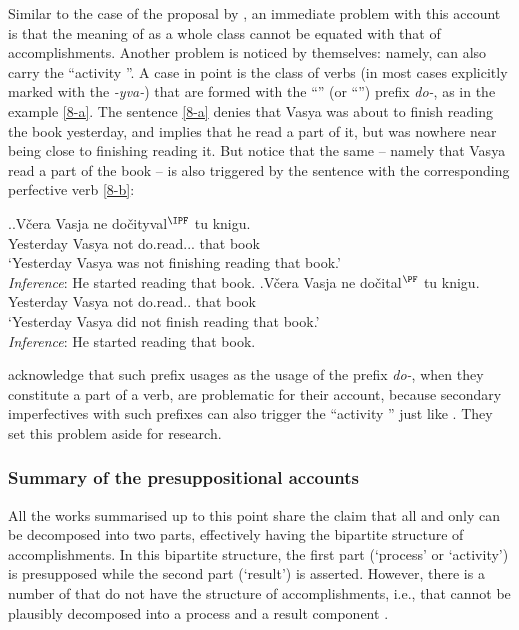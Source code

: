 Similar to the case of the proposal by \citet{Romanova:06}, an immediate problem with this account is that the meaning of  as a whole class cannot be equated with that of accomplishments. Another problem is noticed by \citet{Docekal:09} themselves: namely,  can also carry the ``activity ''. A case in point is the class of  verbs (in most cases explicitly marked with the  \textit{-yva-}) that are formed with the ``'' (or ``'') prefix \textit{do-}, as in the example \ref{8-a}. The sentence \ref{8-a} denies that Vasya was about to finish reading the book yesterday, and implies that he read a part of it, but was nowhere near being close to finishing reading it. But notice that the same  -- namely that Vasya read a part of the book -- is also triggered by the sentence with the corresponding perfective verb \ref{8-b}:

\ex.\label{8}\ag.\label{8-a}V\v{c}era Vasja ne do\v{c}ityval$^{\IPF}$ tu knigu.\\
Yesterday Vasya not do.read... that book\\
\trans `Yesterday Vasya was not finishing reading that book.'\\
\textit{Inference}: He started reading that book.
\bg.\label{8-b}V\v{c}era Vasja ne do\v{c}ital$^{\PF}$ tu knigu.\\
Yesterday Vasya not do.read.. that book\\
\trans `Yesterday Vasya did not finish reading that book.'\\
\textit{Inference}: He started reading that book.

\citet{Docekal:09} acknowledge that such prefix usages as the  usage of the prefix \textit{do-}, when they constitute a part of a  verb, are problematic for their account, because secondary imperfectives with such prefixes can also trigger the ``activity '' just like . They set this problem aside for  research. 

\subsubsection{Summary of the presuppositional accounts}
All the works summarised up to this point share the claim that all and only  can be decomposed into two parts, effectively having the bipartite structure of accomplishments. In this bipartite structure, the first part (`process' or `activity') is presupposed while the second part (`result') is asserted. However, there is a number of  that do not have the structure of accomplishments, i.e., that cannot be plausibly decomposed into a process and a result component \citep[see][and references therein]{Filip:00, FilipRothstein:05}. 

